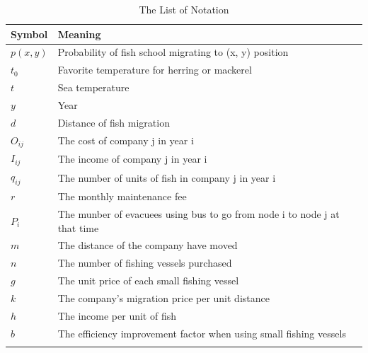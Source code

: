 \documentclass{mcmthesis}
\numberwithin{figure}{section}
\numberwithin{table}{section}
\begin{document}
\begin{center}
\begin{longtable}{p{}p{}m{}}
\caption{The List of Notation}\\
\hline
Symbol& Meaning \\
\hline

$p(x,y)$      & Probability of fish school migrating to (x, y) position
                                                         \\
$t_0$      & Favorite temperature for herring or mackerel
                                                          \\
$t$     & Sea temperature
                                                        \\
$y$       & Year                                                           \\
$d$      & Distance of fish migration                                                            \\
$O_{ij}$       & The cost of company j in year i                                  \\
$I_{ij}$       & The income of company j in year i                                         \\
$q_{ij}$       & The number of units of fish in company j in year i
\\
$r$       & The monthly maintenance fee \\
$P_i$       & The munber of evacuees using bus to go from node i to node j at that time \\
$m$      & The distance of the company have moved                                                            \\
$n$       & The number of fishing vessels purchased                      \\
$g$       & The unit price of each small fishing vessel                     \\
$k$       & The company's migration price per unit distance
\\
$h$       & The income per unit of fish                                                                \\
$b$       & The efficiency improvement factor when using small fishing vessels                         \\
                                                        \\ \hline

 \end{longtable}
 \end{center}
\end{document}
